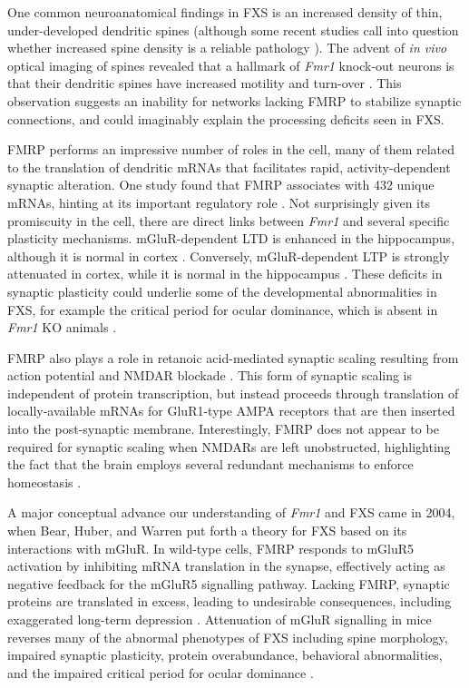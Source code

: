 One common neuroanatomical findings in FXS is an increased density of thin, under-developed dendritic spines \cite{Hinton1991, Comery1997, Dolen2007, Liu2011} (although some recent studies call into question whether increased spine density is a reliable pathology \cite{Cruz-Martin2010, Harlow2010a, Meredith2007}). The advent of \textit{in vivo} optical imaging of spines revealed that a hallmark of \textit{Fmr1} knock-out neurons is that their dendritic spines have increased motility and turn-over \cite{Cruz-Martin2010, Pan2010}. This observation suggests an inability for networks lacking FMRP to stabilize synaptic connections, and could imaginably explain the processing deficits seen in FXS.

FMRP performs an impressive number of roles in the cell, many of them related to the translation of dendritic mRNAs that facilitates rapid, activity-dependent synaptic alteration. One study found that FMRP associates with 432 unique mRNAs, hinting at its important regulatory role \cite{Brown2001}. Not surprisingly given its promiscuity in the cell, there are direct links between \textit{Fmr1} and several specific plasticity mechanisms. mGluR-dependent LTD is enhanced in the hippocampus, although it is normal in cortex \cite{Huber2002}. Conversely, mGluR-dependent LTP is strongly attenuated in cortex, while it is normal in the hippocampus \cite{Li2002, Zhao2005, Wilson2007}. These deficits in synaptic plasticity could underlie some of the developmental abnormalities in FXS, for example the critical period for ocular dominance, which is absent in \textit{Fmr1} KO animals \cite{Dolen2007}.

FMRP also plays a role in retanoic acid-mediated synaptic scaling resulting from action potential and NMDAR blockade \cite{Soden2010}. This form of synaptic scaling is independent of protein transcription, but instead proceeds through translation of locally-available mRNAs for GluR1-type AMPA receptors that are then inserted into the post-synaptic membrane. Interestingly, FMRP does not appear to be required for synaptic scaling when NMDARs are left unobstructed, highlighting the fact that the brain employs several redundant mechanisms to enforce homeostasis \cite{Soden2010}.

A major conceptual advance our understanding of \textit{Fmr1} and FXS came in 2004, when Bear, Huber, and Warren put forth a theory for FXS based on its interactions with mGluR. In wild-type cells, FMRP responds to mGluR5 activation by inhibiting mRNA translation in the synapse, effectively acting as negative feedback for the mGluR5 signalling pathway. Lacking FMRP, synaptic proteins are translated in excess, leading to undesirable consequences, including exaggerated long-term depression \cite{Huber2002, Bear2004}. Attenuation of mGluR signalling in mice reverses many of the abnormal phenotypes of FXS including spine morphology, impaired synaptic plasticity, protein overabundance, behavioral abnormalities, and the impaired critical period for ocular dominance \cite{DeVrij2008, Dolen2007, Su2011}.

